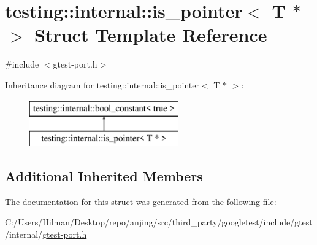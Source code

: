 \hypertarget{structtesting_1_1internal_1_1is__pointer_3_01_t_01_5_01_4}{}\section{testing\+:\+:internal\+:\+:is\+\_\+pointer$<$ T $\ast$ $>$ Struct Template Reference}
\label{structtesting_1_1internal_1_1is__pointer_3_01_t_01_5_01_4}


{\ttfamily \#include $<$gtest-\/port.\+h$>$}

Inheritance diagram for testing\+:\+:internal\+:\+:is\+\_\+pointer$<$ T $\ast$ $>$\+:\begin{figure}[H]
\begin{center}
\leavevmode
\includegraphics[height=2.000000cm]{structtesting_1_1internal_1_1is__pointer_3_01_t_01_5_01_4}
\end{center}
\end{figure}
\subsection*{Additional Inherited Members}


The documentation for this struct was generated from the following file\+:\begin{DoxyCompactItemize}
\item 
C\+:/\+Users/\+Hilman/\+Desktop/repo/anjing/src/third\+\_\+party/googletest/include/gtest/internal/\hyperlink{gtest-port_8h}{gtest-\/port.\+h}\end{DoxyCompactItemize}

